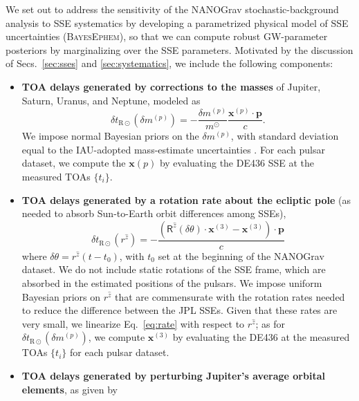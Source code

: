 \documentclass[iop,apj,twocolappendix]{emulateapj}
\begin{document}
We set out to address the sensitivity of the NANOGrav stochastic-background analysis to SSE systematics by developing a parametrized physical model of SSE uncertainties (\textsc{BayesEphem}), so that we can compute robust GW-parameter posteriors by marginalizing over the SSE parameters. 
Motivated by the discussion of Secs.\ \ref{sec:sses} and \ref{sec:systematics}, we include the following components:
%
\begin{itemize} %
%
\item \textbf{TOA delays generated by corrections to the masses} of Jupiter, Saturn, Uranus, and Neptune, modeled as \cite{2010ApJ...720L.201C}
%
\begin{equation}
\label{eq:massperturb}
    \delta t_{\mathrm{R}\odot}(\delta m^{(p)}) = -\frac{\delta m^{(p)}}{m^\odot} \frac{\mathbf{x}^{(p)} \cdot \mathbf{p}}{c}.
\end{equation}
%
We impose normal Bayesian priors on the $\delta m^{(p)}$, with standard deviation equal to the IAU-adopted mass-estimate uncertainties \citep{iaumasses}. For each pulsar dataset, we compute the $\mathbf{x}(p)$ by evaluating the DE436 SSE at the measured TOAs $\{t_i\}$.
%
\item \textbf{TOA delays generated by a rotation rate about the ecliptic pole} (as needed to absorb Sun-to-Earth orbit differences among SSEs),
\begin{equation}
\label{eq:rate}
    \delta t_{\mathrm{R}\odot}(r^{\hat{z}}) =
    -\frac{(\mathsf{R}^{\hat{z}}(\delta \theta) \cdot \mathbf{x}^{(3)} - \mathbf{x}^{(3)}) \cdot \mathbf{p}}{c} 
\end{equation}
%
where $\delta \theta = r^{\hat{z}} (t - t_0)$, with $t_0$ set at the beginning of the NANOGrav dataset.
We do not include static rotations of the SSE frame, which are absorbed in the estimated positions of the pulsars.
We impose uniform Bayesian priors on $r^{\hat{z}}$ that are commensurate with the rotation rates needed to reduce the difference between the JPL SSEs. 
Given that these rates are very small, we linearize Eq.\ \eqref{eq:rate} with respect to $r^{\hat{z}}$; as for $\delta t_{\mathrm{R}\odot}(\delta m^{(p)})$, we compute $\mathbf{x}^{(3)}$ by evaluating the DE436 at the measured TOAs $\{t_i\}$ for each pulsar dataset.
%
\item \textbf{TOA delays generated by perturbing Jupiter's average orbital elements}, as given by
\begin{equation}

\end{equation}
\end{itemize}
\end{document}
